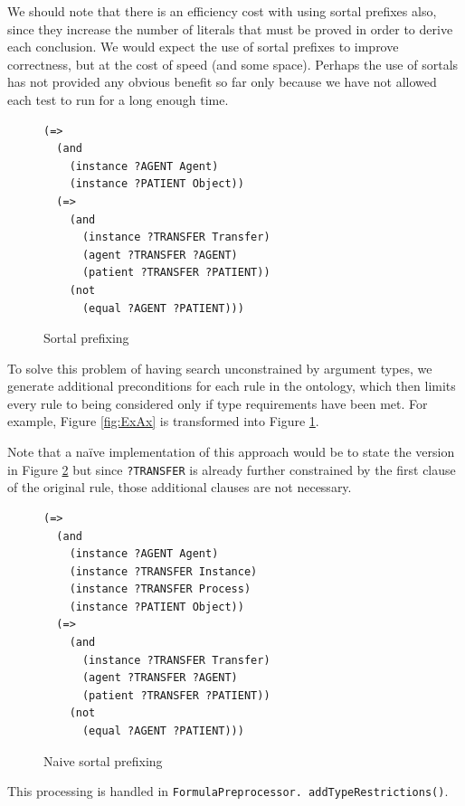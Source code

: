 \documentclass{book}
\begin{document}
We should note that there is an efficiency cost with using sortal prefixes also,
since they increase the number of literals that must be proved in order to
derive each conclusion.  We would expect the use of sortal prefixes to improve
correctness, but at the cost of speed (and some space).  Perhaps the use of
sortals has not provided any obvious benefit so far only because we have not
allowed each test to run for a long enough time.

\begin{figure}
\begin{framed}
\begin{verbatim}
(=>
  (and
    (instance ?AGENT Agent)
    (instance ?PATIENT Object))
  (=>
    (and
      (instance ?TRANSFER Transfer)
      (agent ?TRANSFER ?AGENT)
      (patient ?TRANSFER ?PATIENT))
    (not
      (equal ?AGENT ?PATIENT)))
\end{verbatim}
\caption{Sortal prefixing}
\label{fig:SortPref}
\end{framed}
\end{figure}

To solve this problem of having search unconstrained by argument types, we
generate additional preconditions for each rule in the ontology, which then
limits every rule to being considered only if type requirements have been met.
For example, Figure \ref{fig:ExAx} is transformed into Figure
\ref{fig:SortPref}.

Note that a naïve implementation of this approach would be to state the version
in Figure \ref{fig:NaiveSort} but since {\tt ?TRANSFER} is already further
constrained by the first clause of the original rule, those additional clauses
are not necessary.

\begin{figure}
\begin{framed}
\begin{verbatim}
(=>
  (and
    (instance ?AGENT Agent)
    (instance ?TRANSFER Instance)
    (instance ?TRANSFER Process)
    (instance ?PATIENT Object))
  (=>
    (and
      (instance ?TRANSFER Transfer)
      (agent ?TRANSFER ?AGENT)
      (patient ?TRANSFER ?PATIENT))
    (not
      (equal ?AGENT ?PATIENT)))
\end{verbatim}
\caption{Naive sortal prefixing}
\label{fig:NaiveSort}
\end{framed}
\end{figure}

\begin{sloppypar}
This processing is handled in 
\texttt{FormulaPreprocessor. addTypeRestrictions()}.
\end{sloppypar}
\end{document}
